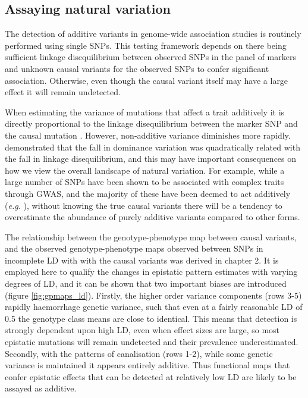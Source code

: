 \subsection{Assaying natural variation}

The detection of additive variants in genome-wide association studies is routinely performed using single SNPs. This testing framework depends on there being sufficient linkage disequilibrium between observed SNPs in the panel of markers and unknown causal variants for the observed SNPs to confer significant association. Otherwise, even though the causal variant itself may have a large effect it will remain undetected.

When estimating the variance of mutations that affect a trait additively it is directly proportional to the linkage disequilibrium between the marker SNP and the causal mutation \citep{Weir2008}. However, non-additive variance diminishes more rapidly. \cite{Weir2008} demonstrated that the fall in dominance variation was quadratically related with the fall in linkage disequilibrium, and this may have important consequences on how we view the overall landscape of natural variation. For example, while a large number of SNPs have been shown to be associated with complex traits through GWAS, and the majority of these have been deemed to act additively (\emph{e.g.} \citealp{Hindorff2010}), without knowing the true causal variants there will be a tendency to overestimate the abundance of purely additive variants compared to other forms.

The relationship between the genotype-phenotype map between causal variants, and the observed genotype-phenotype maps observed between SNPs in incomplete LD with with the causal variants was derived in chapter 2. It is employed here to qualify the changes in epistatic pattern estimates with varying degrees of LD, and it can be shown that two important biases are introduced (figure \ref{fig:gpmaps_ld}). Firstly, the higher order variance components (rows 3-5) rapidly haemorrhage genetic variance, such that even at a fairly reasonable LD of 0.5 the genotype class means are close to identical. This means that detection is strongly dependent upon high LD, even when effect sizes are large, so most epistatic mutations will remain undetected and their prevalence underestimated. Secondly, with the patterns of canalisation (rows 1-2), while some genetic variance is maintained it appears entirely additive. Thus functional maps that confer epistatic effects that can be detected at relatively low LD are likely to be assayed as additive.

